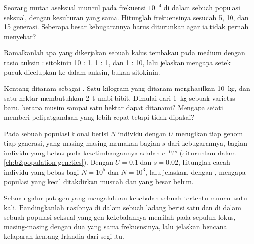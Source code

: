 \begin{exercise}[$\star\star$]\label{exo:b2:asexual-reproduction:7}
Seorang mutan aseksual muncul pada frekuensi $10^{-4}$ di dalam sebuah
populasi seksual, dengan kesuburan yang sama. Hitunglah frekuensinya
sesudah 5, 10, dan 15 generasi. Seberapa besar kebugarannya harus
diturunkan agar ia tidak pernah menyebar?
\end{exercise}

\begin{exercise}[$\star\star$]\label{exo:b2:asexual-reproduction:8}
Ramalkanlah apa yang dikerjakan sebuah kalus tembakau pada medium
dengan rasio auksin : sitokinin 10 : 1, 1 : 1, dan 1 : 10, lalu
jelaskan mengapa setek pucuk dicelupkan ke dalam auksin, bukan
sitokinin.
\end{exercise}

\begin{exercise}[$\star\star$]\label{exo:b2:asexual-reproduction:9}
Kentang ditanam sebagai . Satu kilogram yang ditanam
menghasilkan \qty{10}{kg}, dan satu hektar membutuhkan \qty{2}{t} umbi
bibit. Dimulai dari \qty{1}{kg} sebuah varietas baru, berapa musim
sampai satu hektar dapat ditanami? Mengapa  sejati memberi
pelipatgandaan yang lebih cepat tetapi tidak dipakai?
\end{exercise}

\begin{exercise}[$\star\star\star$]\label{exo:b2:asexual-reproduction:10}
Pada sebuah populasi klonal berisi $N$ individu dengan $U$ 
merugikan tiap genom tiap generasi, yang masing-masing memakan bagian
$s$ dari kebugarannya, bagian individu yang bebas  pada
kesetimbangannya adalah $e^{-U/s}$ (diturunkan dalam
\cref{ch:b2:population-genetics}). Dengan $U =
0.1$ dan $s = 0.02$, hitunglah cacah individu yang bebas  bagi
$N = 10^{5}$ dan $N = 10^{3}$, lalu jelaskan, dengan ,
mengapa populasi yang kecil ditakdirkan musnah dan yang besar belum.
\end{exercise}

\begin{exercise}[$\star\star\star$]\label{exo:b2:asexual-reproduction:11}
Sebuah galur patogen yang mengalahkan kekebalan sebuah 
tertentu muncul satu kali. Bandingkanlah nasibnya di dalam sebuah ladang
berisi satu  dan di dalam sebuah populasi seksual yang gen
kekebalannya memilah pada sepuluh lokus, masing-masing dengan dua 
yang sama frekuensinya, lalu jelaskan bencana kelaparan kentang
Irlandia dari segi itu.
\end{exercise}

